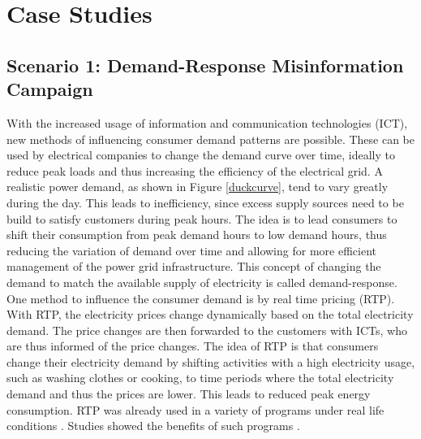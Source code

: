 \chapter{Case Studies}




\section{Scenario 1: Demand-Response Misinformation Campaign}
\label{demandresponsesection}

With the increased usage of information and communication 
technologies (ICT), new methods of influencing
consumer demand patterns are possible. 
These can be used by electrical companies to change the 
demand curve over time, ideally to reduce peak loads 
and thus increasing the efficiency of the electrical grid.
A realistic power demand, as shown in Figure \ref{duckcurve}, tend 
to vary greatly during the day. This leads to inefficiency,
since excess supply sources need to be build to satisfy customers
during peak hours. The idea is to lead consumers to shift
their consumption from peak demand hours to low demand hours,
thus reducing the variation of demand over time and allowing
for more efficient management of the power grid infrastructure.
This concept of changing the demand to match the 
available supply of electricity is called demand-response. 
One method to influence the consumer demand is by real time 
pricing (RTP). With RTP, the electricity prices change
dynamically based on the total electricity demand.
The price changes are then forwarded to the customers with ICTs, 
who are thus informed of the price changes.
The idea of RTP is that consumers change their electricity demand
by shifting activities with a high electricity usage, 
such as washing clothes or cooking, to time periods 
where the total electricity demand and thus the prices
are lower. This leads to reduced peak energy consumption. 
RTP was already used in a variety of programs
under real life conditions \cite{barbose2004survey}.
Studies showed the benefits of such programs \cite{albadi2008summary}.


